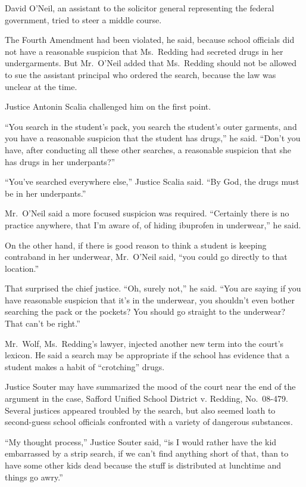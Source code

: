 \documentclass[12pt,a4paper,onecolumn]{article}
\begin{document}
David O'Neil, an assistant to the solicitor general representing the federal government, tried to
steer a middle course.

The Fourth Amendment had been violated, he said, because school officials did not have a reasonable
suspicion that Ms.~Redding had secreted drugs in her undergarments. But Mr.~O'Neil added that
Ms.~Redding should not be allowed to sue the assistant principal who ordered the search, because the
law was unclear at the time.

Justice Antonin Scalia challenged him on the first point.

``You search in the student's pack, you search the student's outer garments, and you have a
reasonable suspicion that the student has drugs,'' he said. ``Don't you have, after conducting all
these other searches, a reasonable suspicion that she has drugs in her underpants?''

``You've searched everywhere else,'' Justice Scalia said. ``By God, the drugs must be in her
underpants.''

Mr.~O'Neil said a more focused suspicion was required. ``Certainly there is no practice anywhere,
that I'm aware of, of hiding ibuprofen in underwear,'' he said.

On the other hand, if there is good reason to think a student is keeping contraband in her
underwear, Mr.~O'Neil said, ``you could go directly to that location.''

That surprised the chief justice. ``Oh, surely not,'' he said. ``You are saying if you have
reasonable suspicion that it's in the underwear, you shouldn't even bother searching the pack or the
pockets? You should go straight to the underwear? That can't be right.''

Mr.~Wolf, Ms.~Redding's lawyer, injected another new term into the court's lexicon. He said a search
may be appropriate if the school has evidence that a student makes a habit of ``crotching'' drugs.

Justice Souter may have summarized the mood of the court near the end of the argument in the case,
Safford Unified School District v. Redding, No.~08-479. Several justices appeared troubled by the
search, but also seemed loath to second-guess school officials confronted with a variety of
dangerous substances.

``My thought process,'' Justice Souter said, ``is I would rather have the kid embarrassed by a strip
search, if we can't find anything short of that, than to have some other kids dead because the stuff
is distributed at lunchtime and things go awry.''
\end{document}
